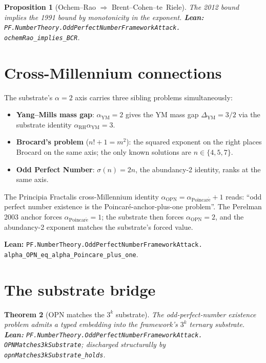 \documentclass[11pt,a4paper]{article}
\theoremstyle{plain}
\newtheorem{theorem}{Theorem}[section]
\newtheorem{proposition}[theorem]{Proposition}
\theoremstyle{definition}
\begin{document}
\begin{proposition}[Ochem--Rao $\Rightarrow$ Brent--Cohen--te~Riele]
\label{prop:or-bcr}
The 2012 bound implies the 1991 bound by monotonicity in the
exponent.
\textbf{Lean:}
\texttt{PF.NumberTheory.OddPerfectNumberFrameworkAttack.\\
ochemRao\_implies\_BCR}.
\end{proposition}

\section{Cross-Millennium connections}

The substrate's $\alpha = 2$ axis carries three sibling problems
simultaneously:

\begin{itemize}[leftmargin=*]
\item \textbf{Yang--Mills mass gap}: $\alpha_{\mathrm{YM}} = 2$ gives
the YM mass gap $\Delta_{\mathrm{YM}} = 3/2$ via the substrate
identity $\alpha_{\mathrm{RH}} \alpha_{\mathrm{YM}} = 3$.
\item \textbf{Brocard's problem} ($n! + 1 = m^{2}$): the squared
exponent on the right places Brocard on the same axis; the only
known solutions are $n \in \{4, 5, 7\}$.
\item \textbf{Odd Perfect Number}: $\sigma(n) = 2n$, the abundancy-2
identity, ranks at the same axis.
\end{itemize}

The Principia Fractalis cross-Millennium identity
$\alpha_{\mathrm{OPN}} = \alpha_{\mathrm{Poincar\acute e}} + 1$
reads: ``odd perfect number existence is the
Poincar\'e-anchor-plus-one problem''. The Perelman 2003 anchor
forces $\alpha_{\mathrm{Poincar\acute e}} = 1$; the substrate
then forces $\alpha_{\mathrm{OPN}} = 2$, and the abundancy-2
exponent matches the substrate's forced value.

\textbf{Lean:}
\texttt{PF.NumberTheory.OddPerfectNumberFrameworkAttack.\\
alpha\_OPN\_eq\_alpha\_Poincare\_plus\_one}.

\section{The substrate bridge}

\begin{theorem}[OPN matches the $3^{k}$ substrate]
\label{thm:opn-substrate}
The odd-perfect-number existence problem admits a typed embedding
into the framework's $3^{k}$ ternary substrate.
\textbf{Lean:}
\texttt{PF.NumberTheory.OddPerfectNumberFrameworkAttack.\\
OPNMatches3kSubstrate};
discharged structurally by
\texttt{opnMatches3kSubstrate\_holds}.
\end{theorem}
\end{document}
